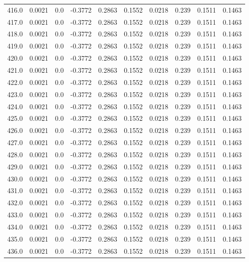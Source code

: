 \begin{longtable}{lrrrrrrrrr}
416.0 & 0.0021 & 0.0 & -0.3772 & 0.2863 & 0.1552 & 0.0218 & 0.239 & 0.1511 & 0.1463 \\
417.0 & 0.0021 & 0.0 & -0.3772 & 0.2863 & 0.1552 & 0.0218 & 0.239 & 0.1511 & 0.1463 \\
418.0 & 0.0021 & 0.0 & -0.3772 & 0.2863 & 0.1552 & 0.0218 & 0.239 & 0.1511 & 0.1463 \\
419.0 & 0.0021 & 0.0 & -0.3772 & 0.2863 & 0.1552 & 0.0218 & 0.239 & 0.1511 & 0.1463 \\
420.0 & 0.0021 & 0.0 & -0.3772 & 0.2863 & 0.1552 & 0.0218 & 0.239 & 0.1511 & 0.1463 \\
421.0 & 0.0021 & 0.0 & -0.3772 & 0.2863 & 0.1552 & 0.0218 & 0.239 & 0.1511 & 0.1463 \\
422.0 & 0.0021 & 0.0 & -0.3772 & 0.2863 & 0.1552 & 0.0218 & 0.239 & 0.1511 & 0.1463 \\
423.0 & 0.0021 & 0.0 & -0.3772 & 0.2863 & 0.1552 & 0.0218 & 0.239 & 0.1511 & 0.1463 \\
424.0 & 0.0021 & 0.0 & -0.3772 & 0.2863 & 0.1552 & 0.0218 & 0.239 & 0.1511 & 0.1463 \\
425.0 & 0.0021 & 0.0 & -0.3772 & 0.2863 & 0.1552 & 0.0218 & 0.239 & 0.1511 & 0.1463 \\
426.0 & 0.0021 & 0.0 & -0.3772 & 0.2863 & 0.1552 & 0.0218 & 0.239 & 0.1511 & 0.1463 \\
427.0 & 0.0021 & 0.0 & -0.3772 & 0.2863 & 0.1552 & 0.0218 & 0.239 & 0.1511 & 0.1463 \\
428.0 & 0.0021 & 0.0 & -0.3772 & 0.2863 & 0.1552 & 0.0218 & 0.239 & 0.1511 & 0.1463 \\
429.0 & 0.0021 & 0.0 & -0.3772 & 0.2863 & 0.1552 & 0.0218 & 0.239 & 0.1511 & 0.1463 \\
430.0 & 0.0021 & 0.0 & -0.3772 & 0.2863 & 0.1552 & 0.0218 & 0.239 & 0.1511 & 0.1463 \\
431.0 & 0.0021 & 0.0 & -0.3772 & 0.2863 & 0.1552 & 0.0218 & 0.239 & 0.1511 & 0.1463 \\
432.0 & 0.0021 & 0.0 & -0.3772 & 0.2863 & 0.1552 & 0.0218 & 0.239 & 0.1511 & 0.1463 \\
433.0 & 0.0021 & 0.0 & -0.3772 & 0.2863 & 0.1552 & 0.0218 & 0.239 & 0.1511 & 0.1463 \\
434.0 & 0.0021 & 0.0 & -0.3772 & 0.2863 & 0.1552 & 0.0218 & 0.239 & 0.1511 & 0.1463 \\
435.0 & 0.0021 & 0.0 & -0.3772 & 0.2863 & 0.1552 & 0.0218 & 0.239 & 0.1511 & 0.1463 \\
436.0 & 0.0021 & 0.0 & -0.3772 & 0.2863 & 0.1552 & 0.0218 & 0.239 & 0.1511 & 0.1463 \\

\end{longtable}
